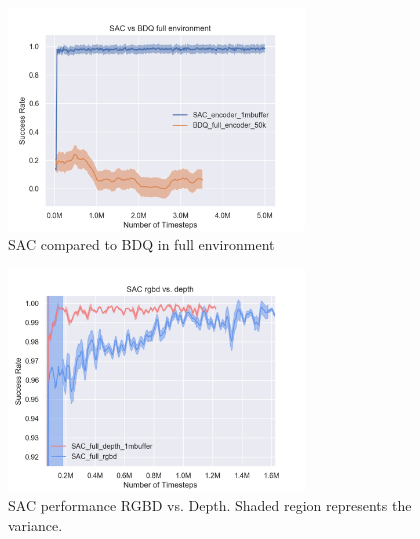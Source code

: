 \begin{figure}[!htbp]
    \centering
        \includegraphics[width=0.7\textwidth]{figures/SACfull/SAC_vs_BDQ_full_environment}
    \caption{SAC compared to BDQ in full environment}
    \label{fig:bdq}
\end{figure}

\begin{figure}[!htbp]
    \centering
        \includegraphics[width=0.7\textwidth]{figures/SACfull/SAC_rgbd_vs_depth}
    \caption{SAC performance RGBD vs. Depth. Shaded region represents the variance.}
    \label{fig:depthvsrgbd}
\end{figure}
